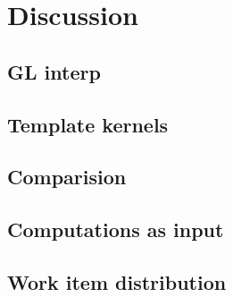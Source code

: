 \section{Discussion}

\subsection{GL interp}
\subsection{Template kernels}
\subsection{Comparision}
\subsection{Computations as input}
\subsection{Work item distribution}
